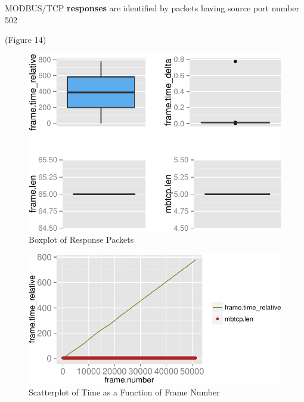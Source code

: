\documentclass[11pt,]{article}
\begin{document}
MODBUS/TCP \textbf{responses} are identified by packets having source
port number 502

(Figure 14)

\nobreak

\begin{figure}

{\centering \includegraphics{thesis_files/figure-latex/unnamed-chunk-23-1} 

}

\caption{Boxplot of Response Packets}\label{fig:unnamed-chunk-23}
\end{figure}

\clearpage

\begin{figure}

{\centering \includegraphics{thesis_files/figure-latex/unnamed-chunk-24-1} 

}

\caption{Scatterplot of Time as a Function of Frame Number}\label{fig:unnamed-chunk-24}
\end{figure}
\end{document}
